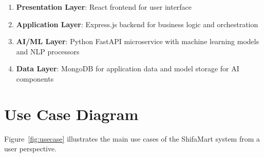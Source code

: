 \documentclass[12pt,a4paper]{article}
\begin{document}
\begin{enumerate}
    \item \textbf{Presentation Layer}: React frontend for user interface
    \item \textbf{Application Layer}: Express.js backend for business logic and orchestration
    \item \textbf{AI/ML Layer}: Python FastAPI microservice with machine learning models and NLP processors
    \item \textbf{Data Layer}: MongoDB for application data and model storage for AI components
\end{enumerate}

\section{Use Case Diagram}
Figure~\ref{fig:usecase} illustrates the main use cases of the ShifaMart system from a user perspective.
\end{document}
